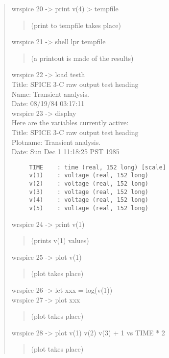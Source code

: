 \begin{quote}
{ wrspice 20 -> print v(4) > tempfile\\
 \begin{quote}
  {\rm (print to tempfile takes place)}
 \end{quote}

 wrspice 21 -> shell lpr tempfile\\
 \begin{quote}
  {\rm (a printout is made of the results)}
 \end{quote}

 wrspice 22 -> load testh\\
 Title:  SPICE 3-C raw output test heading\\
 Name:  Transient analysis.\\
 Date:  08/19/84 03:17:11\\

 wrspice 23 -> display\\
 Here are the variables currently active:\\

 Title: SPICE 3-C raw output test heading\\
 Plotname: Transient analysis.\\
 Date: Sun Dec 1 11:18:25 PST 1985\\
 \begin{verbatim}
     TIME    : time (real, 152 long) [scale]
     v(1)    : voltage (real, 152 long)
     v(2)    : voltage (real, 152 long)
     v(3)    : voltage (real, 152 long)
     v(4)    : voltage (real, 152 long)
     v(5)    : voltage (real, 152 long)
 \end{verbatim}

 wrspice 24 -> print v(1)\\
 \begin{quote}
  {\rm (prints v(1) values)}
 \end{quote}

 wrspice 25 -> plot v(1)\\
 \begin{quote}
  {\rm (plot takes place)}
 \end{quote}

 wrspice 26 -> let xxx = log(v(1))\\
 wrspice 27 -> plot xxx\\
 \begin{quote}
  {\rm (plot takes place)}
 \end{quote}

 wrspice 28 -> plot v(1) v(2) v(3) + 1 vs TIME * 2\\
 \begin{quote}
  {\rm (plot takes place)}
 \end{quote}

}
\end{quote}
